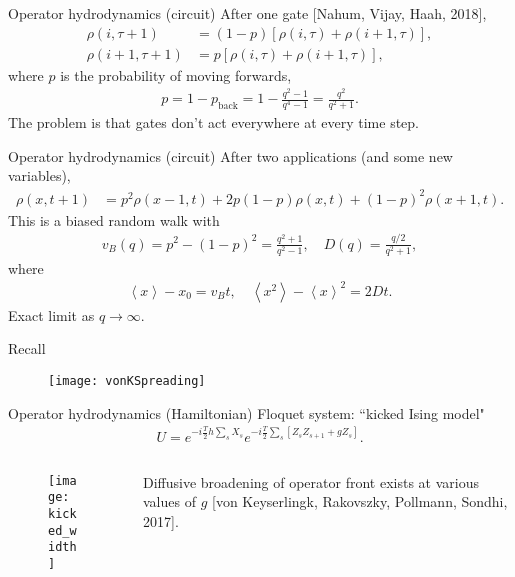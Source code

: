 \documentclass{beamer}
\newcommand{\ex}[1]{\left\langle #1 \right\rangle}
\renewcommand{\t}{\tau}
\newcommand{\nn}{\nonumber\\}
\begin{document}
\begin{frame}{Operator hydrodynamics (circuit)}
After one gate [Nahum, Vijay, Haah, 2018],
\begin{align}
\rho(i,\t+1) &= (1-p)\left[\rho(i,\t)+\rho(i+1,\t)\right],\nn
\rho(i+1,\t+1) &= p\left[\rho(i,\t)+\rho(i+1,\t)\right],\nonumber
\end{align}
where $p$ is the probability of moving forwards, 
\begin{align}
p = 1-p_\text{back} = 1-\frac{q^2-1}{q^4-1} = \frac{q^2}{q^2+1}. \nonumber
\end{align}
The problem is that gates don't act everywhere at every time step.
\end{frame}

\begin{frame}{Operator hydrodynamics (circuit)}
After two applications (and some new variables),
\begin{align}
\rho(x,t+1)&=p^2\rho(x-1,t)+2p(1-p)\rho(x,t)+(1-p)^2\rho(x+1,t).\nonumber
\end{align}
This is a biased random walk with
\begin{align}
v_B(q) = p^2 - (1-p)^2 = \frac{q^2 +1}{q^2-1},\quad D(q)=\frac{q/2}{q^2 +1},\nonumber
\end{align}
where
\begin{align}
\ex{x} -  x_0 = v_Bt,\quad \ex{x^2} - \ex{x}^2 = 2Dt.\nonumber
\end{align}
Exact limit as $q\to\infty$.
\end{frame}

\begin{frame}{Recall}
\begin{figure}
	\centering
	\texttt{[image: vonKSpreading]}
\end{figure}
\end{frame}

\begin{frame}{Operator hydrodynamics (Hamiltonian)}
Floquet system: ``kicked Ising model"
\begin{align}
U = e^{-i \frac{T}{2} h \sum_s X_s} e^{-i\frac{T}{2}\sum_s[Z_sZ_{s+1} + gZ_s]}. \nonumber
\end{align}
\begin{columns}
	\begin{column}{0.4\textwidth}  %
		\begin{figure}
			\centering
			\texttt{[image: kicked\_width]}
		\end{figure}
	\end{column}
	\begin{column}{0.7\textwidth}
		Diffusive broadening of operator front exists at various values of $g$ [von Keyserlingk, Rakovszky, Pollmann, Sondhi, 2017].
	\end{column}
\end{columns}
\end{frame}
\end{document}
